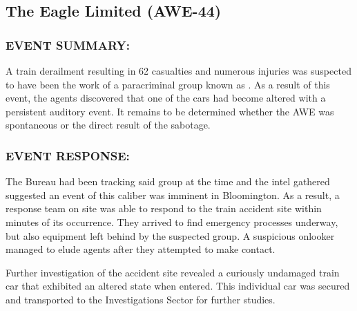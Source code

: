 \subsection*{The Eagle Limited (AWE-44)}
\subsubsection*{EVENT SUMMARY:}
\par A train derailment resulting in 62 casualties and numerous injuries
was suspected to have been the work of a paracriminal group
known as . As a result of this event, the agents
discovered that one of the cars had become altered with a
persistent auditory event. It remains to be determined whether the
AWE was spontaneous or the direct result of the sabotage.
\subsubsection*{EVENT RESPONSE:}
\par The Bureau had been tracking said group at the time and the intel
gathered suggested an event of this caliber was imminent in
Bloomington. As a result, a response team on site was able to
respond to the train accident site within minutes of its
occurrence. They arrived to find emergency processes underway,
but also equipment left behind by the suspected group. A
suspicious onlooker managed to elude agents after they
attempted to make contact.
\par Further investigation of the accident site revealed a curiously
undamaged train car that exhibited an altered state when entered.
This individual car was secured and transported to the
Investigations Sector for further studies.